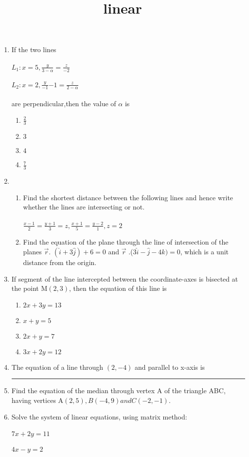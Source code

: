 \documentclass{article}
\title{linear}
\begin{document}
\begin{enumerate}
	\item If the two lines
   	\\
	\\ $L_1 : x=5, \frac{y}{3-\alpha} = \frac{z}{-2}$
   	\\
   	\\ $L_2 : x=2, \frac{y}{-1}{-1} = \frac{z}{2-\alpha}$
   	\\
   	\\ are perpendicular,then the value of $\alpha$ is
   	\begin{enumerate}[label=(\Alph*)]
   		\item $\frac{2}{3}$
		\item $3$
		\item $4$
		\item $\frac{7}{3}$
	\end{enumerate}
	\item \begin{enumerate} %
	\item Find the shortest distance between the following lines and hence write whether the lines are intersecting or not.
		\\
	\\ $\frac{x-1}{2} = \frac{y+1}{3} = z, \frac{x+1}{5} = \frac{y-2}{1}, z=2$
	\\
	\item Find the equation of the plane through the line of intersection of the planes $\vec{r}$. $(\hat{i}+3\hat{j}) + 6 = 0$ and $\vec{r}$ .($3\hat{i}-\hat{j}-4\hat{k}) = 0$, which is a unit distance from the origin.
	\end{enumerate}
	\item If segment of the line intercepted between the coordinate-axes is bisected at the point M$(2,3)$, then the equation of this line is
		\begin{enumerate}[label=(\Alph*)]
			\item $2x + 3y = 13$
			\item $x+y = 5$
			\item $2x + y = 7$
			\item $3x + 2y = 12$
		\end{enumerate}
	\item The equation of a line through $(2,-4)$ and parallel to x-axis is\rule{1cm}{0.15mm}
	\item Find the equation of the median through vertex A of the triangle ABC, having vertices A$(2,5),B(-4,9) and C(-2,-1).$
	\item Solve the system of linear equations, using matrix method:
		\\
		\\ $7x+2y = 11$
		\\
		\\ $4x-y = 2$

\end{enumerate}
\end{document}
